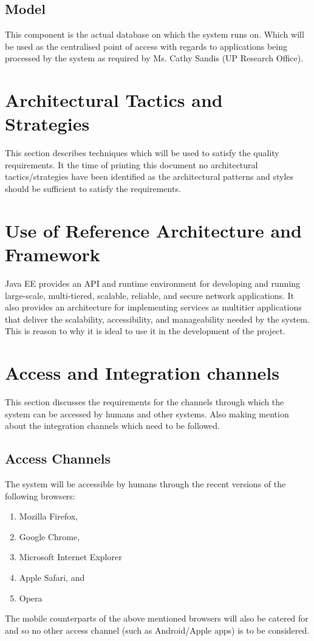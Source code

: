 \documentclass[12pt]{article}
\newcommand{\client}{Ms. Cathy Sandis (UP Research Office)}
\begin{document}
\subsection*{Model}
This component is the actual database on which the system runs on. Which will be used as the centralised point of access with regards to applications being processed by the system as required by \client .
 
\section{Architectural Tactics and Strategies} %
This section describes techniques which will be used to satisfy the quality requirements. It the time of printing this document no architectural tactics/strategies have been identified as the architectural patterns and styles should be sufficient to satisfy the requirements.

\section{Use of Reference Architecture and Framework}
Java EE provides an API and runtime environment for developing and running large-scale, multi-tiered, scalable, reliable, and secure network applications. It also provides an architecture for implementing services as
multitier applications that deliver the scalability, accessibility, and manageability needed by the system. This is reason to why it is ideal to use it in the development of the project.

\section{Access and Integration channels}
This section discusses the requirements for the channels through which the system can be accessed by humans and other systems. Also making mention about the integration channels which need to be followed. 

\subsection{Access Channels}
The system will be accessible by humans through the recent versions of the following browsers:
\begin{enumerate}
\item Mozilla Firefox,
\item Google Chrome,
\item Microsoft Internet Explorer
\item Apple Safari, and
\item Opera
\end{enumerate}
The mobile counterparts of the above mentioned browsers will also be catered for and so no other access channel (such as Android/Apple apps) is to be considered.
\end{document}
